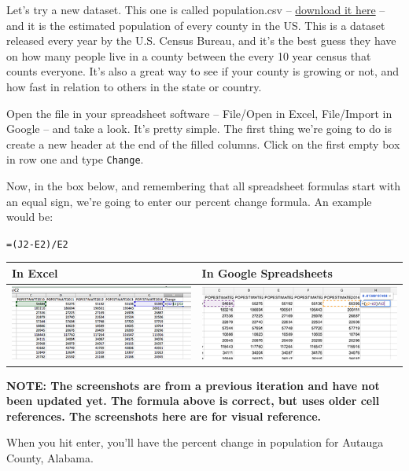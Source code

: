 \documentclass[]{book}
\begin{document}
Let's try a new dataset. This one is called population.csv -- \href{https://www.dropbox.com/s/nqs144kwpaxcc2q/population.csv?dl=0}{download it here} -- and it is the estimated population of every county in the US. This is a dataset released every year by the U.S. Census Bureau, and it's the best guess they have on how many people live in a county between the every 10 year census that counts everyone. It's also a great way to see if your county is growing or not, and how fast in relation to others in the state or country.

Open the file in your spreadsheet software -- File/Open in Excel, File/Import in Google -- and take a look. It's pretty simple. The first thing we're going to do is create a new header at the end of the filled columns. Click on the first empty box in row one and type \texttt{Change}.

Now, in the box below, and remembering that all spreadsheet formulas start with an equal sign, we're going to enter our percent change formula. An example would be:

\texttt{=(J2-E2)/E2}

\begin{longtable}[]{@{}ll@{}}
\toprule
In Excel & In Google Spreadsheets\tabularnewline
\midrule
\endhead
\includegraphics{images/excelchange1.png} & \includegraphics{images/googlechange1.png}\tabularnewline
\bottomrule
\end{longtable}

\textbf{NOTE: The screenshots are from a previous iteration and have not been updated yet. The formula above is correct, but uses older cell references. The screenshots here are for visual reference.}

When you hit enter, you'll have the percent change in population for Autauga County, Alabama.
\end{document}
